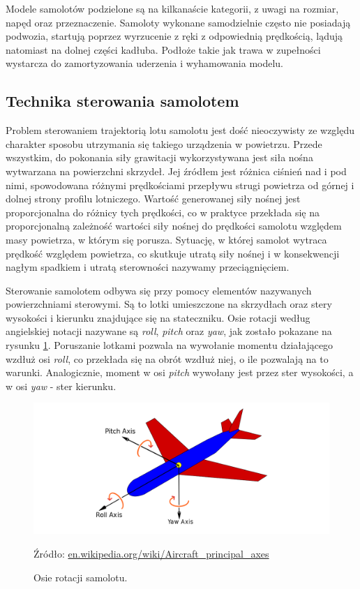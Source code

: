 \documentclass[12pt, a4paper]{article}
\begin{document}
Modele samolotów podzielone są na kilkanaście kategorii, z uwagi na rozmiar, napęd oraz przeznaczenie. Samoloty wykonane samodzielnie często nie posiadają podwozia, startują poprzez wyrzucenie z ręki z odpowiednią prędkością, lądują natomiast na dolnej części kadłuba. Podłoże takie jak trawa w zupełności wystarcza do zamortyzowania uderzenia i wyhamowania modelu.
 

\subsection{Technika sterowania samolotem}
Problem sterowaniem trajektorią lotu samolotu jest dość nieoczywisty ze względu charakter sposobu utrzymania się takiego urządzenia w powietrzu. Przede wszystkim, do pokonania siły grawitacji wykorzystywana jest siła nośna wytwarzana na powierzchni skrzydeł. Jej źródłem jest różnica ciśnień nad i pod nimi, spowodowana różnymi prędkościami przepływu strugi powietrza od górnej i dolnej strony profilu lotniczego. Wartość generowanej siły nośnej jest proporcjonalna do różnicy tych prędkości, co w praktyce przekłada się na proporcjonalną zależność wartości siły nośnej do prędkości samolotu względem masy powietrza, w którym się porusza. Sytuację, w której samolot wytraca prędkość względem powietrza, co skutkuje utratą siły nośnej i w konsekwencji nagłym spadkiem i utratą sterowności nazywamy przeciągnięciem.

Sterowanie samolotem odbywa się przy pomocy elementów nazywanych powierzchniami sterowymi. Są to lotki umieszczone na skrzydłach oraz stery wysokości i kierunku znajdujące się na stateczniku. Osie rotacji według angielskiej notacji nazywane są \textit{roll}, \textit{pitch} oraz \textit{yaw}, jak zostało pokazane na rysunku \ref{fig:osie}. Poruszanie lotkami pozwala na wywołanie momentu działającego wzdłuż osi \textit{roll}, co przekłada się na obrót wzdłuż niej, o ile pozwalają na to warunki. Analogicznie, moment w osi \textit{pitch} wywołany jest przez ster wysokości, a w osi \textit{yaw} - ster kierunku.

\begin{figure}[H]
    \centering
    \includegraphics[width=1\textwidth]{osie}
    \caption{Osie rotacji samolotu.}
    \small Źródło: \url{en.wikipedia.org/wiki/Aircraft_principal_axes}
    \label{fig:osie}
\end{figure}
\end{document}
